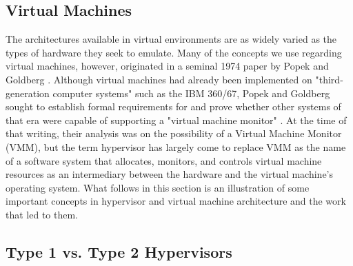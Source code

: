 \subsection{Virtual Machines}
\label{sec:sys_arch_vm}
The architectures available in virtual environments are as widely varied as the types 
of hardware they seek to emulate.  Many of the concepts we use regarding virtual machines,
however, originated in a seminal 1974 paper by Popek and Goldberg \autocite{popek_1}.  Although 
virtual machines had already been implemented on "third-generation computer systems" 
such as the IBM 360/67, Popek and Goldberg sought to establish formal requirements 
for and prove whether other systems of that era were capable of supporting a 
"virtual machine monitor" \autocite{popek_1}.  At the time of that writing, their analysis 
was on the possibility of a Virtual Machine Monitor (VMM), but the term hypervisor
has largely come to replace VMM as the name of a software system that allocates,
monitors, and controls virtual machine resources as an intermediary between the hardware
and the virtual machine's operating system.  What follows in this section is an 
illustration of some important concepts in hypervisor and virtual machine architecture
and the work that led to them.

\subsection{Type 1 vs. Type 2 Hypervisors}
\label{sec:sys_arch_vm_type}

